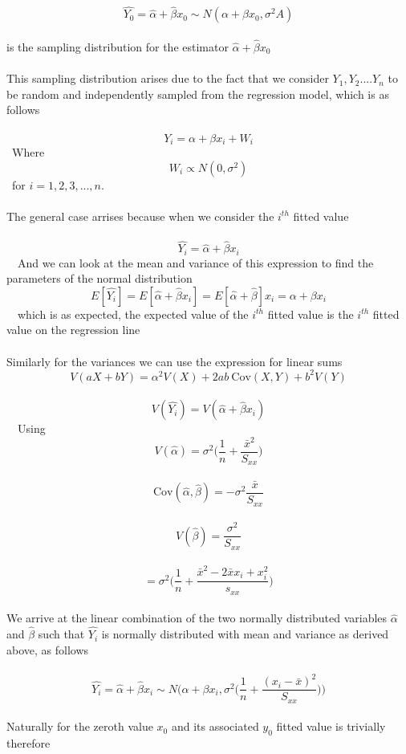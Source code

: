 \documentclass[11pt]{article}   	%
\begin{document}
\[ \hat{Y_0} = \hat{\alpha} + \hat{\beta}x_0 \sim N( \alpha + \beta x_0, \sigma^2  A ) \] \
\\
is the sampling distribution for the estimator $ \hat{\alpha} + \hat{\beta} x_0 $ \\
\\
This sampling distribution arises due to the fact that we consider $ Y_1, Y_2. ... Y_n $ to be random and independently sampled from the regression model, which is as follows \\
\
\[ Y_i = \alpha + \beta x_i + W_i \]
\
Where \
\[ W_i \propto N(0, \sigma^2) \] 
\
for $ i = 1, 2, 3, ... , n. $ \\
\\
The general case arrises because when we consider the $ i^{th} $ fitted value \\
\
\[ \hat{Y_i} = \hat{\alpha} + \hat{\beta}x_i \] \
\
And we can look at the mean and variance of this expression to find the parameters of the normal distribution \
\
\[ E[\hat{Y_i}] = E[\hat{\alpha} + \hat{\beta}x_i] = E[\hat{\alpha} + \hat{\beta}]x_i = \alpha + \beta x_i \]  \
\
which is as expected, the expected value of the $ i^{th} $ fitted value is the $ i^{th} $ fitted value on the regression line \\
\\
Similarly for the variances we can use the expression for linear sums 
\\
\[ V(aX + bY)  = \alpha^2 V(X) + 2ab \ \text{Cov}(X, Y) + b^2 V(Y) \] \
\
\[ V(\hat{Y_i}) = V( \hat{\alpha} + \hat{\beta} x_i ) \] \
\
Using \
\
\[ V(\hat{\alpha}) = \sigma^2 \bigg( \frac{1}{n} + \frac{ \bar{x}^2 }{S_{xx}} \bigg) \] \
\\
\[ \text{Cov} (\hat{\alpha}, \hat{\beta}) = - \sigma^2 \frac{\bar{x}}{S_{xx}} \] \
\
\[ V(\hat{\beta}) = \frac{\sigma^2}{S_{xx}} \] \
\
\[ = \sigma^2 \bigg( \frac{1}{n} + \frac{ \bar{x}^2 - 2 \bar{x}x_i + x_i^2 } { s_{xx} } \bigg) \]
\\
We arrive at the linear combination of the two normally distributed variables $ \hat{\alpha} $ and $ \hat{\beta} $ such that $ \hat{Y_i} $ is normally distributed with mean and variance as derived above, as follows \\
\
\[ \hat{Y_i} = \hat{\alpha} + \hat{\beta}x_i \sim N \Bigg( \alpha + \beta x_i, \sigma^2 \bigg( \frac{1}{n} + \frac{(x_i - \bar{x})^2}{S_{xx}} \bigg) \Bigg) \] \
\\
Naturally for the zeroth value $ x_0 $ and its associated $ y_0 $ fitted value is trivially therefore \\
\end{document}
